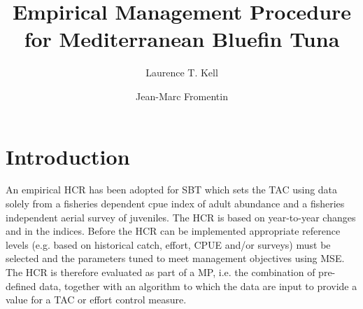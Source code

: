 \documentclass[%
nonumbib,      %
%
]{nrc1}                          %
\begin{document}





\title{Empirical Management Procedure for Mediterranean Bluefin Tuna}

\author{Laurence T. Kell}        
\address{ICCAT Secretariat, C/Coraz\'{o}n de Mar\'{\i}a, 8. 28002 Madrid, Spain; ~Laurie.Kell@iccat.int; ~Phone: +34 914 165 600 ~Fax: +34 914 152 612.}
        
\author{Jean-Marc Fromentin}          
\address{{IFREMER - UMR EME 212, Av. Jean Monnet, 34200 S\`ete, France.}}




\begin{abstract}


\end{abstract}

\begin{resume}
\end{resume}

\maketitle

\section*{Introduction}

An empirical HCR has been adopted for \gls{SBT} which sets the \gls{TAC}  using data solely from a fisheries dependent \gls{cpue} 
index of adult abundance and a fisheries independent aerial survey of juveniles. The HCR is based on year-to-year changes and in the indices. Before the HCR can be implemented appropriate reference levels (e.g. based on historical catch, effort, CPUE and/or surveys) must be selected and the parameters tuned to meet management objectives using \gls{MSE}. The HCR is therefore evaluated as part of a \gls{MP}, i.e. the combination of pre-defined data, together with an algorithm to which the data are input to provide a value for a TAC or effort control measure.
\end{document}
